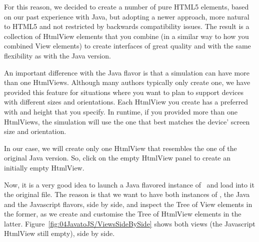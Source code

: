 For this reason, we decided to create a number of pure HTML5 elements, based on our past experience with Java, but adopting a newer approach, more natural to HTML5 and not restricted by backwards compatibility issues. The result is a collection of HtmlView elements that you combine (in a similar way to how you combined View elements) to create interfaces of great quality and with the same flexibility as with the Java version.

An important difference with the Java flavor is that a simulation can have more than one HtmlViews. Although many authors typically only create one, we have provided this feature for situations where you want to plan to support devices with different sizes and orientations. Each HtmlView you create has a preferred with and height that you specify. In runtime, if you provided more than one HtmlViews, the simulation will use the one that best matches the device' screen size and orientation.

In our case, we will create only one HtmlView that resembles the one of the original Java version. So, click on the empty HtmlView panel to create an initially empty HtmlView.

Now, it is a very good idea to launch a Java flavored instance of \ejs\ and load into it the original  file. The reason is that we want to have both instances of \ejs, the Java and the Javascript flavors, side by side, and inspect the Tree of View elements in the former, as we create and customise the Tree of HtmlView elements in the latter. Figure~\ref{fig:04JavatoJS/ViewsSideBySide} shows both views (the Javascript HtmlView still empty), side by side.

